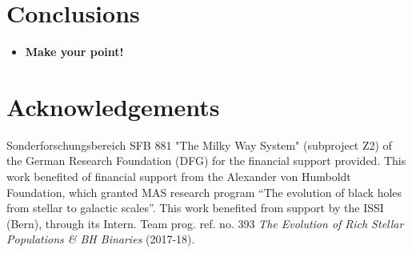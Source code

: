 \documentclass[twocolumn]{aastex62}
\begin{document}
\section{Conclusions}

\begin{itemize}
\item {\bf Make your point!}
\end{itemize}

\section*{Acknowledgements}

Sonderforschungsbereich SFB 881 "The Milky Way System" (subproject Z2) of the German Research Foundation (DFG) for the financial support provided. This work benefited of financial support from the Alexander von Humboldt Foundation, which granted MAS research program ``The evolution of black holes from stellar to galactic scales''. 
This work benefited from support by the ISSI (Bern), through its Intern. Team prog. ref. no. 393 {\it The Evolution of Rich Stellar Populations \& BH Binaries} (2017-18).


\footnotesize{


}
\end{document}
